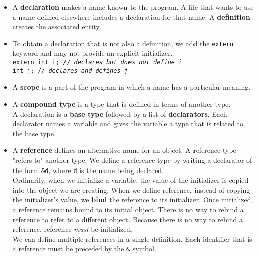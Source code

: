 \begin{itemize}
\item A \textbf{declaration} makes a name known to the program. A file that wants to use a name defined elsewhere includes a declaration for that name. A \textbf{definition} creates the associated entity.

\item To obtain a declaration that is not also a definition, we add the \texttt{extern} keyword and may not provide an explicit initializer.\\\hspace*{1em}\texttt{extern int i; // \textit{declares but does not define i}}\\\hspace*{1em}\texttt{int j; // \textit{declares and defines j}}

\item A \textbf{scope} is a part of the program in which a name has a particular meaning.

\item A \textbf{compound type} is a type that is defined in terms of another type.\\A declaration is a \textbf{base type} followed by a list of \textbf{declarators}. Each declarator names a variable and gives the variable a type that is related to the base type.

\item A \textbf{reference} defines an alternative name for an object. A reference type "refers to" another type. We define a reference type by writing a declarator of the form \texttt{\&d}, where \texttt{d} is the name being declared.\\Ordinarily, when we initialize a variable, the value of the initializer is copied into the object we are creating. When we define reference, instead of copying the initializer's value, we \textbf{bind} the reference to its initializer. Once initialized, a reference remains bound to its initial object. There is no way to rebind a reference to refer to a different object. Because there is no way to rebind a reference, reference \textit{must} be initialized.\\We can define multiple references in a single definition. Each identifier that is a reference must be preceded by the \texttt{\&} symbol.


\end{itemize}
